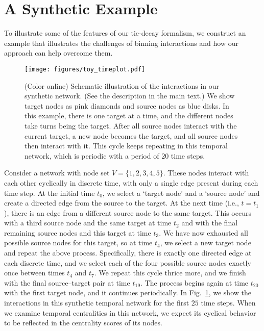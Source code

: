 \documentclass[journal,transmag]{IEEEtran}
\begin{document}

\section{A Synthetic Example}
\label{sec:synthetic}
%

To illustrate some of the features of our tie-decay formalism,
we construct an example that illustrates the challenges of binning
interactions and how our approach can help overcome them.


\begin{figure}[tp]
  \centering
  \texttt{[image: figures/toy\_timeplot.pdf]}
  \caption{(Color online) Schematic illustration of the interactions in our
    synthetic network. (See the description in the main text.)
    We show target nodes as pink diamonds and
    source nodes as blue disks. In this example, there is one target at a
    time, and the different nodes take turns being the target. After
    all source nodes interact with the current target, a new node
    becomes the target, and all source nodes then interact with
    it. This cycle keeps repeating in this temporal network, which is
    periodic with a period of $20$ time steps.  
      }
  \label{fig:synNetTimeplot}
\end{figure}


Consider a network with node set $V = \lbrace{1, 2, 3, 4, 5}
\rbrace$. These nodes interact with each other cyclically in discrete
time, with only a single edge present during each time step.
 At the initial time $t_0$, we select a `target
node' and a `source node' and create a directed edge from the source
to the target. At the next time (i.e., $t = t_1$), there is an edge
from a different source node to the same target. This occurs with a
third source node and the same target at time $t_2$ and with the final
remaining source nodes and this target at time $t_3$. We have now
exhausted all possible source nodes for this target, so at time $t_4$,
we select a new target node and repeat the above
process. Specifically, there is exactly one directed edge at each discrete time,
and we select each of the four possible source nodes exactly
once between times $t_4$ and $t_7$. We repeat this cycle thrice more,
and we finish with the final source--target pair at time
$t_{19}$. The process begins again at time $t_{20}$ with the first target
node, and it continues periodically. In
Fig.~\ref{fig:synNetTimeplot}, we show the interactions in this
synthetic temporal network for the first $25$ time steps.  When we
examine temporal centralities in this network, we expect its cyclical
behavior to be reflected in the centrality scores of its nodes.
\end{document}
